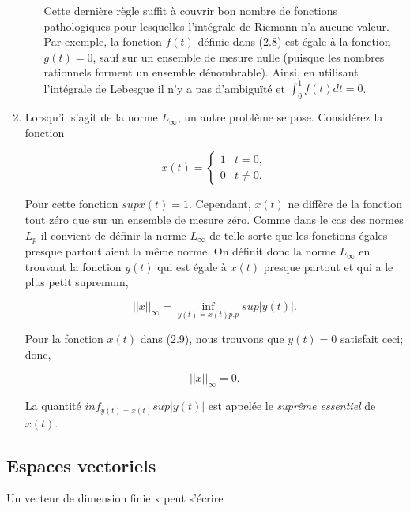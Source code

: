 \documentclass[11pt,twoside,a4paper]{article}
\begin{document}
\begin{enumerate}
\begin{enumerate}
    \noindent
    Cette dernière règle suffit à couvrir bon nombre de fonctions pathologiques pour lesquelles l'intégrale de Riemann n'a aucune valeur. Par exemple, la fonction $f(t)$ définie dans (2.8) est égale à la fonction $g(t) = 0$, sauf sur un ensemble de mesure nulle (puisque les nombres rationnels forment un ensemble dénombrable). 
    Ainsi, en utilisant l'intégrale de Lebesgue il n'y a pas d'ambiguïté et $\int_{0}^{1}f(t)dt = 0$.
  \end{enumerate}

  \item Lorsqu'il s'agit de la norme $L_\infty$, un autre problème se pose. Considérez la fonction
  
  \begin{equation}
    x(t) = \begin{cases} 1 & t = 0, \\
      0 &  t \neq 0.
          \end{cases}
  \end{equation}

  \noindent
  Pour cette fonction $sup x(t) = 1$. Cependant, $x(t)$ ne diffère de la fonction tout zéro que sur un ensemble de mesure zéro. Comme dans le cas des normes $L_p$ il convient de définir la norme $L_\infty$ de telle sorte que les fonctions égales presque partout aient la même norme. 
  On définit donc la norme $L_\infty$ en trouvant la fonction $y(t)$ qui est égale à $x(t)$ presque partout et qui a le plus petit supremum,

  \begin{equation*}
    ||x||_{\infty} = \inf_{y(t)=x(t) p.p} sup |y(t)|.
  \end{equation*}

  \noindent
  Pour la fonction $x(t)$ dans (2.9), nous trouvons que $y(t) = 0$ satisfait ceci; donc,

  \begin{equation*}
    ||x||_{\infty} = 0.
  \end{equation*}

  \noindent
  La quantité $inf_{y(t)=x(t)} sup |y(t)|$ est appelée le \textit{suprême essentiel} de $x(t)$.
\end{enumerate}


\subsection{Espaces vectoriels}

\noindent
Un vecteur de dimension finie x peut s'écrire
\end{document}
